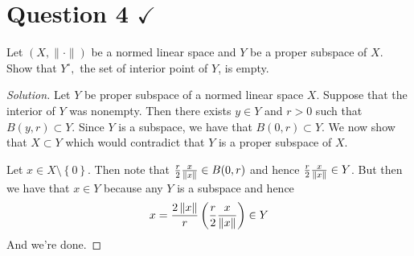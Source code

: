 \section{Question 4 \texorpdfstring{$\checkmark$}{}}
\horz
Let $(X,\|\cdot\|)$ be a normed linear space and $Y$ be a proper subspace of $X$. Show that $Y^{\circ},$ the set of interior point of $Y$, is empty.
\horz

\begin{proof}[Solution]
    Let $Y$ be proper subspace of a normed linear space $X$. Suppose that the interior of $Y$ was nonempty. Then there exists $y\in Y$ and $r>0$ such that $B(y,r) \subset Y$. Since $Y$ is a subspace, we have that $B(0,r) \subset Y$. We now show that $X \subset Y$ which would contradict that $Y$ is a proper subspace of $X$. 

    Let $x\in X \setminus \left\{ 0 \right\}$. Then note that $\frac{r}{2} \frac{x}{\left\lVert x \right\rVert} \in B(0,r)$ and  hence $\frac{r}{2} \frac{x}{\left\lVert x \right\rVert} \in Y$. But then we have that $x \in Y$ because any $Y$ is a subspace and hence 
    \begin{align*}
	x= \frac{2\left\lVert x \right\rVert}{r} \left( \frac{r}{2} \frac{x}{\left\lVert x \right\rVert} \right) \in Y
    \end{align*}
    And we're done.
\end{proof}
